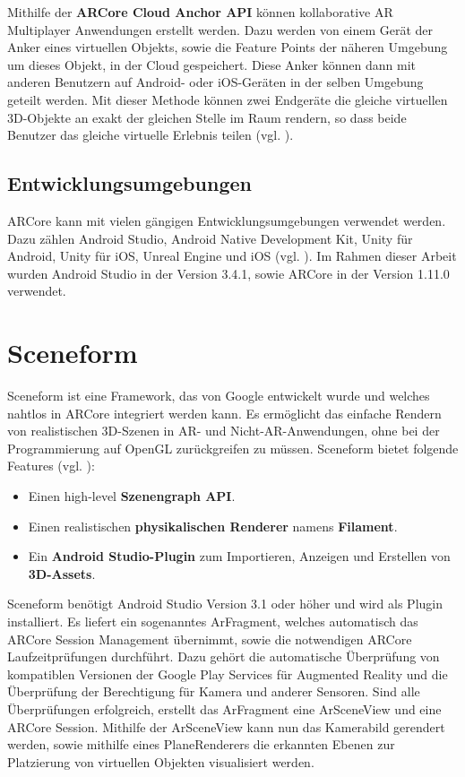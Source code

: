 Mithilfe der \textbf{ARCore Cloud Anchor API} können kollaborative AR Multiplayer Anwendungen erstellt werden. Dazu werden von einem Gerät der Anker eines virtuellen Objekts, sowie die Feature Points der näheren Umgebung um dieses Objekt, in der Cloud gespeichert. Diese Anker können dann mit anderen Benutzern auf Android- oder iOS-Geräten in der selben Umgebung geteilt werden. Mit dieser Methode können zwei Endgeräte die gleiche virtuellen 3D-Objekte an exakt der gleichen Stelle im Raum rendern, so dass beide Benutzer das gleiche virtuelle Erlebnis teilen (vgl. \cite{fundamental_concepts}).

\subsection{Entwicklungsumgebungen}

ARCore kann mit vielen gängigen Entwicklungsumgebungen verwendet werden. Dazu zählen Android Studio, Android Native Development Kit, Unity für Android, Unity für iOS, Unreal Engine und iOS (vgl. \cite{develop}). Im Rahmen dieser Arbeit wurden Android Studio in der Version 3.4.1, sowie ARCore in der Version 1.11.0 verwendet.

\section{Sceneform}
Sceneform ist eine Framework, das von Google entwickelt wurde und welches nahtlos in ARCore integriert werden kann. Es ermöglicht das einfache Rendern von realistischen 3D-Szenen in AR- und Nicht-AR-Anwendungen, ohne bei der Programmierung auf OpenGL zurückgreifen zu müssen. Sceneform bietet folgende Features (vgl. \cite{sceneform}):

\begin{itemize}
\item Einen \glqq high-level\grqq{} \textbf{Szenengraph API}.
\item Einen realistischen \textbf{physikalischen Renderer} namens \textbf{Filament}.
\item Ein \textbf{Android Studio-Plugin} zum Importieren, Anzeigen und Erstellen von \textbf{3D-Assets}.
\end{itemize}

Sceneform benötigt Android Studio Version 3.1 oder höher und wird als Plugin installiert. Es liefert ein sogenanntes \glqq ArFragment\grqq{}, welches automatisch das ARCore Session Management übernimmt, sowie die notwendigen ARCore Laufzeitprüfungen durchführt. Dazu gehört die automatische Überprüfung von kompatiblen Versionen der Google Play Services für Augmented Reality und die Überprüfung der Berechtigung für Kamera und anderer Sensoren. Sind alle Überprüfungen erfolgreich, erstellt das ArFragment eine \glqq ArSceneView\grqq{} und eine ARCore Session. Mithilfe der ArSceneView kann nun das Kamerabild gerendert werden, sowie mithilfe eines \glqq PlaneRenderers\grqq{} die erkannten Ebenen zur Platzierung von virtuellen Objekten visualisiert werden.

